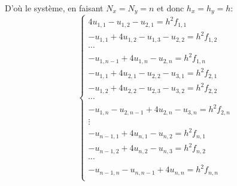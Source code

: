 \documentclass{beamer}
\begin{document}
\begin{frame} 
D'où le système, en faisant $N_x=N_y=n$ et donc $h_x=h_y=h$:
\[\left\{\begin{array}{l}
4u_{1,1}-u_{1,2}-u_{2,1}=h^2f_{1,1}\\
   -u_{1,1}+4u_{1,2}-u_{1,3} -u_{2,2} =h^2f_{1,2}\\
   \cdots\\
  -u_{1,n-1}+4u_{1,n} -u_{2,n} =h^2f_{1,n}\\
\hline
   -u_{1,1}+4u_{2,1}-u_{2,2}-u_{3,1}  =h^2f_{2,1}\\
   -u_{1,2}+4u_{2,2}-u_{2,3}-u_{3,2}  =h^2f_{2,2}\\
     \cdots\\
     -u_{1,n}-u_{2,n-1}+4u_{2,n} -u_{3,n} =h^2f_{2,n}\\
  \hline
      \vdots\\
      \hline  
     -u_{n-1,1}+4u_{n,1}-u_{n,2}  =h^2f_{n,1}\\
   -u_{n-1,2}+4u_{n,2}-u_{n,3} =h^2f_{n,2}\\
     \cdots\\
     -u_{n-1,n}-u_{n,n-1}+4u_{n,n}  =h^2f_{n,n}\\    
\end{array}\right.
\]


 \end{frame}
 
\end{document}
